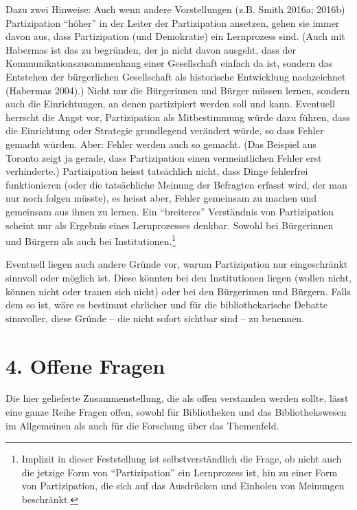 \documentclass[a4paper,
fontsize=11pt,
oneside,
numbers=noperiodatend,
parskip=half-,
bibliography=totoc,
final
]{scrartcl}
\begin{document}
Dazu zwei Hinweise: Auch wenn andere Vorstellungen (z.B. Smith 2016a;
2016b) Partizipation \enquote{höher} in der Leiter der Partizipation
ansetzen, gehen sie immer davon aus, dass Partizipation (und Demokratie)
ein Lernprozess sind. (Auch mit Habermas ist das zu begründen, der ja
nicht davon ausgeht, dass der Kommunikationszusammenhang einer
Gesellschaft einfach da ist, sondern das Entstehen der bürgerlichen
Gesellschaft als historische Entwicklung nachzeichnet (Habermas 2004).)
Nicht nur die Bürgerinnen und Bürger müssen lernen, sondern auch die
Einrichtungen, an denen partizipiert werden soll und kann. Eventuell
herrscht die Angst vor, Partizipation als Mitbestimmung würde dazu
führen, dass die Einrichtung oder Strategie grundlegend verändert würde,
so dass Fehler gemacht würden. Aber: Fehler werden auch so gemacht. (Das
Beispiel aus Toronto zeigt ja gerade, dass Partizipation einen
vermeintlichen Fehler erst verhinderte.) Partizipation heisst
tatsächlich nicht, dass Dinge fehlerfrei funktionieren (oder die
tatsächliche Meinung der Befragten erfasst wird, der man nur noch folgen
müsste), es heisst aber, Fehler gemeinsam zu machen und gemeinsam aus
ihnen zu lernen. Ein \enquote{breiteres} Verständnis von Partizipation
scheint nur als Ergebnis eines Lernprozesses denkbar. Sowohl bei
Bürgerinnen und Bürgern als auch bei Institutionen.\footnote{Implizit in
  dieser Feststellung ist selbstverständlich die Frage, ob nicht auch
  die jetzige Form von \enquote{Partizipation} ein Lernprozess ist, hin
  zu einer Form von Partizipation, die sich auf das Ausdrücken und
  Einholen von Meinungen beschränkt.}

Eventuell liegen auch andere Gründe vor, warum Partizipation nur
eingeschränkt sinnvoll oder möglich ist. Diese könnten bei den
Institutionen liegen (wollen nicht, können nicht oder trauen sich nicht)
oder bei den Bürgerinnen und Bürgern. Falls dem so ist, wäre es bestimmt
ehrlicher und für die bibliothekarische Debatte sinnvoller, diese Gründe
-- die nicht sofort sichtbar sind -- zu benennen.

\hypertarget{offene-fragen}{%
\section{4. Offene Fragen}\label{offene-fragen}}

Die hier gelieferte Zusammenstellung, die als offen verstanden werden
sollte, lässt eine ganze Reihe Fragen offen, sowohl für Bibliotheken und
das Bibliothekswesen im Allgemeinen als auch für die Forschung über das
Themenfeld.
\end{document}
